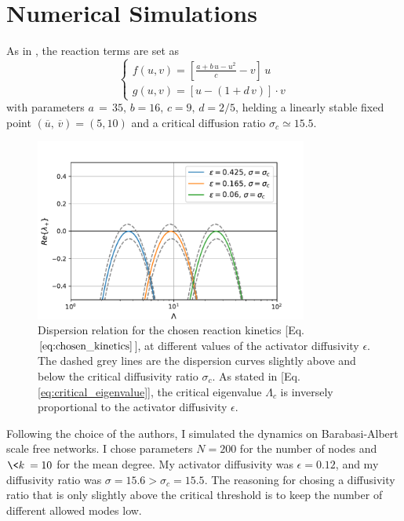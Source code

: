 \section{Numerical Simulations}
As in \cite{main_network}, the reaction terms are set as
\begin{equation}
    \begin{cases}
        f(u,v) = [\frac{a + b\,u -u^2}{c} - v]\, u \\
        g(u, v) = [u - (1+ d\,v)]\cdot v 
    \end{cases}
\label{eq:chosen_kinetics}
\end{equation}
with parameters $a\,=\,35,\, b=16,\, c= 9,\, d= 2/5$, 
helding a linearly stable fixed point $(\overline{u},\, \overline{v}) = (5, 10)$ and a critical diffusion ratio $\sigma_c \simeq 15.5$. \newline \noindent
\begin{figure}[H]
    \centering
    \includegraphics[width=0.8\textwidth]{latex_source/images/turing/multiple_dispersion.pdf}
    \caption{Dispersion relation for the chosen reaction kinetics [Eq. $\ref{eq:chosen_kinetics}$], at different values of the activator diffusivity $\epsilon$. The dashed grey lines are the dispersion curves slightly above and below the critical diffusivity ratio $\sigma_c$. As stated in [Eq. \ref{eq:critical_eigenvalue}], the critical eigenvalue $\Lambda_c$ is inversely proportional to the activator diffusivity $\epsilon$.}
\end{figure}
Following the choice of the authors, I simulated the dynamics on Barabasi-Albert scale free networks. I chose parameters $N = 200$ for the number of nodes and $\<k\> = 10$ for the mean degree. My activator diffusivity was $\epsilon = 0.12$, and my diffusivity ratio was $\sigma = 15.6 > \sigma_c = 15.5$. The reasoning for chosing a diffusivity ratio that is only slightly above the critical threshold is to keep the number of different allowed modes low.
